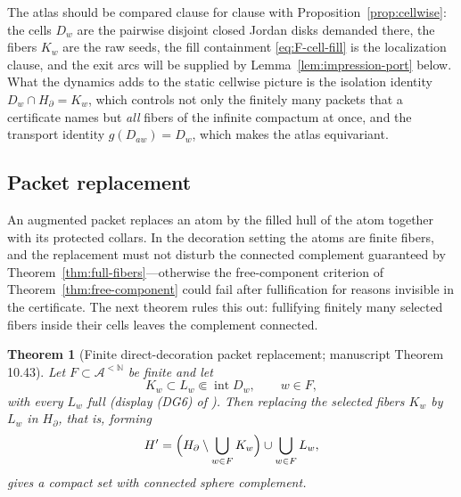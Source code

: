 \documentclass[11pt,reqno]{amsart}
\newtheorem{theorem}{Theorem}[section]
\theoremstyle{definition}
\theoremstyle{remark}
\newcommand{\Int}{\operatorname{int}}
\begin{document}
The atlas should be compared clause for clause with
Proposition~\ref{prop:cellwise}: the cells $D_w$ are the pairwise
disjoint closed Jordan disks demanded there, the fibers $K_w$ are the
raw seeds, the fill containment \eqref{eq:F-cell-fill} is the
localization clause, and the exit arcs will be supplied by
Lemma~\ref{lem:impression-port} below.  What the dynamics adds to the
static cellwise picture is the isolation identity
$D_w\cap H_\partial=K_w$, which controls not only the finitely many
packets that a certificate names but \emph{all} fibers of the infinite
compactum at once, and the transport identity $g(D_{aw})=D_w$, which
makes the atlas equivariant.

\subsection{Packet replacement}\label{subsec:F-replacement}

An augmented packet replaces an atom by the filled hull of the atom
together with its protected collars.  In the decoration setting the atoms
are finite fibers, and the replacement must not disturb the connected
complement guaranteed by Theorem~\ref{thm:full-fibers}---otherwise the
free-component criterion of Theorem~\ref{thm:free-component} could fail
after fullification for reasons invisible in the certificate.  The next
theorem rules this out: fullifying finitely many selected fibers inside
their cells leaves the complement connected.

\begin{theorem}[Finite direct-decoration packet replacement; manuscript
Theorem 10.43]\label{thm:packet-replacement}
Let $F\subset\mathcal A^{<\mathbb N}$ be finite and let
\begin{equation}\label{eq:F-replacement}
K_w\subset L_w\Subset\Int D_w,\qquad w\in F,
\end{equation}
with every $L_w$ full (display (DG6) of \cite{MWman}).  Then replacing
the selected fibers $K_w$ by $L_w$ in $H_\partial$, that is, forming
\[
H'
=\Bigl(H_\partial\setminus\bigcup_{w\in F}K_w\Bigr)
\cup\bigcup_{w\in F}L_w ,
\]
gives a compact set with connected sphere complement.
\end{theorem}
\end{document}
